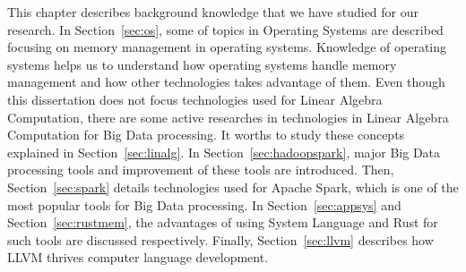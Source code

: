 This chapter describes background knowledge that we have studied for our research.
In Section~\ref{sec:os}, some of topics in Operating Systems are described focusing on memory management in operating systems.
Knowledge of operating systems helps us to understand how operating systems handle memory management and 
how other technologies takes advantage of them. Even though this dissertation does not focus technologies used for Linear Algebra Computation, 
there are some active researches in technologies in Linear Algebra Computation for Big Data processing. 
It worths to study these concepts explained in Section~\ref{sec:linalg}. 
In Section~\ref{sec:hadoopspark}, major Big Data processing tools and improvement of these tools are introduced. 
Then, Section~\ref{sec:spark} details technologies used for Apache Spark, which is one of the most popular tools for Big Data processing.
In Section~\ref{sec:appsys} and Section~\ref{sec:rustmem}, the advantages of using System Language and Rust for such tools are discussed respectively.
Finally, Section~\ref{sec:llvm} describes how LLVM thrives computer language development. 


